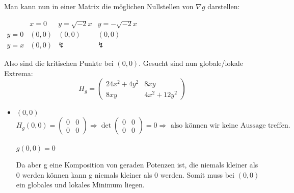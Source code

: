 \documentclass[10pt,a4paper,parskip=half]{scrartcl}
\begin{document}
\begin{enumerate}[(i)]
Man kann nun in einer Matrix die möglichen Nullstellen von $\nabla g$ darstellen: \\
\begin{center}
\begin{math}
	\begin{array}{c|ccc}
	 & x = 0 & y = \sqrt{-2} x & y = - \sqrt{-2} x\\
	 \hline
	 y = 0 & (0,0) & (0,0) & (0,0) \\
	 y = x & (0,0) & \lightning & \lightning
	\end{array}
\end{math}
\end{center}
Also sind die kritischen Punkte bei $(0,0)$. Gesucht sind nun globale/lokale Extrema:
	\[H_g = 
	\begin{pmatrix}
		24x^2 + 4y^2 & 8xy \\
		8xy & 4x^2 + 12y^2
	\end{pmatrix} \]
	\begin{itemize}
		\item 	$(0,0)$
			\[H_g(0,0) = 
			\begin{pmatrix}
				0 & 0 \\
				0 & 0		
			\end{pmatrix} \Rightarrow 
			\det \begin{pmatrix}
				0 & 0 \\
				0 & 0		
			\end{pmatrix} = 0 \Rightarrow \text{ also können wir keine Aussage treffen.}\]\\
			$g(0,0) = 0$
			
			Da aber g eine Komposition von geraden Potenzen ist, die niemals kleiner als 0 werden können kann g niemals kleiner als 0 werden. Somit muss bei $(0,0)$ ein globales und lokales Minimum liegen.
	\end{itemize}
\end{enumerate}
\end{document}
